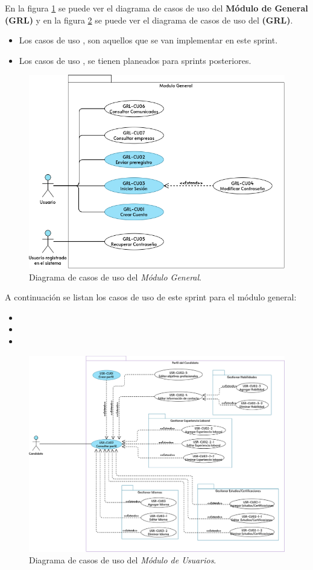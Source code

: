     En la figura \ref{dcu:MUSR} se puede ver el diagrama de casos de uso del \textbf{Módulo de General (GRL)} y en la figura 
    \ref{dcu:CUPUSR} se puede ver el diagrama de casos de uso del \textbf{(GRL)}.
    \begin{itemize}
        \item Los casos de uso \IUazul{} , son aquellos que se van implementar en este sprint.
        \item Los casos de uso \IUblanco{}, se tienen planeados para sprints posteriores.
    \end{itemize} 

    \begin{figure}[H]
        \begin{center}
            \includegraphics[width=.7\textwidth]{sprints/imagenes/CUGRL.png}
        \end{center}
        \caption{Diagrama de casos de uso del \textit{Módulo General}.}
        \label{dcu:MUSR}
    \end{figure}

    A continuación se listan los casos de uso de este sprint para el módulo general:
    \begin{itemize}
        \item {}
        \item {}
        \item {}
    \end{itemize} 

    \begin{figure}[H]
        \begin{center}
            \includegraphics[width=.7\textwidth]{sprints/imagenes/CUPUSR.png}
        \end{center}
        \caption{Diagrama de casos de uso del \textit{Módulo de Usuarios}.}
        \label{dcu:CUPUSR}
    \end{figure}

